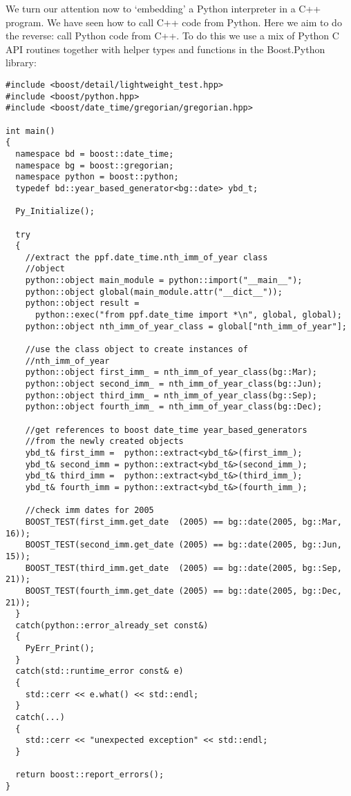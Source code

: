 We turn our attention now to `embedding' a Python interpreter in a
C++ program. We have seen how to call C++ code from Python. Here we
aim to do the reverse: call Python code from C++. To do this we use a
mix of Python C API routines together with helper types and functions
in the Boost.Python  library:
\begin{verbatim}
#include <boost/detail/lightweight_test.hpp>
#include <boost/python.hpp>
#include <boost/date_time/gregorian/gregorian.hpp>

int main()
{
  namespace bd = boost::date_time;
  namespace bg = boost::gregorian;
  namespace python = boost::python;
  typedef bd::year_based_generator<bg::date> ybd_t;

  Py_Initialize();

  try
  {
    //extract the ppf.date_time.nth_imm_of_year class
    //object
    python::object main_module = python::import("__main__");
    python::object global(main_module.attr("__dict__"));
    python::object result =
      python::exec("from ppf.date_time import *\n", global, global);
    python::object nth_imm_of_year_class = global["nth_imm_of_year"];

    //use the class object to create instances of
    //nth_imm_of_year
    python::object first_imm_ = nth_imm_of_year_class(bg::Mar);
    python::object second_imm_ = nth_imm_of_year_class(bg::Jun);
    python::object third_imm_ = nth_imm_of_year_class(bg::Sep);
    python::object fourth_imm_ = nth_imm_of_year_class(bg::Dec);

    //get references to boost date_time year_based_generators
    //from the newly created objects
    ybd_t& first_imm =  python::extract<ybd_t&>(first_imm_);
    ybd_t& second_imm = python::extract<ybd_t&>(second_imm_);
    ybd_t& third_imm =  python::extract<ybd_t&>(third_imm_);
    ybd_t& fourth_imm = python::extract<ybd_t&>(fourth_imm_);

    //check imm dates for 2005
    BOOST_TEST(first_imm.get_date  (2005) == bg::date(2005, bg::Mar, 16));
    BOOST_TEST(second_imm.get_date (2005) == bg::date(2005, bg::Jun, 15));
    BOOST_TEST(third_imm.get_date  (2005) == bg::date(2005, bg::Sep, 21));
    BOOST_TEST(fourth_imm.get_date (2005) == bg::date(2005, bg::Dec, 21));
  }
  catch(python::error_already_set const&)
  {
    PyErr_Print();
  }
  catch(std::runtime_error const& e)
  {
    std::cerr << e.what() << std::endl;
  }
  catch(...)
  {
    std::cerr << "unexpected exception" << std::endl;
  }

  return boost::report_errors();
}
\end{verbatim}

